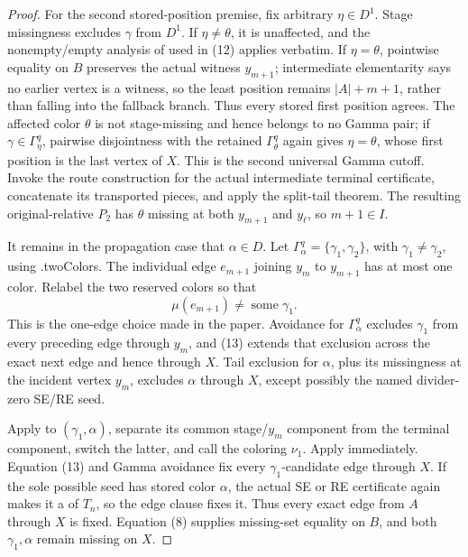 \begin{proof}
For the second stored-position premise, fix arbitrary
\(\eta\in D^1\).  Stage missingness excludes \(\gamma\) from \(D^1\).  If
\(\eta\ne\theta\), it is unaffected, and the nonempty/empty analysis of
 used in (12) applies verbatim.  If
\(\eta=\theta\), pointwise equality on \(B\) preserves the actual witness
\(y_{m+1}\); intermediate elementarity says no earlier vertex is a witness,
so the least position remains \(|A|+m+1\), rather than falling into the
fallback branch.  Thus every stored first position agrees.  The affected
color \(\theta\) is not stage-missing and hence belongs to no Gamma pair;
if \(\gamma\in\Gamma^q_\eta\), pairwise disjointness with the retained
\(\Gamma^q_\theta\) again gives \(\eta=\theta\), whose first position is
the last vertex of \(X\).  This is the second universal Gamma cutoff.
Invoke the route construction for the actual intermediate terminal
certificate, concatenate its transported pieces, and apply the split-tail
theorem.  The resulting original-relative \(P_2\) has \(\theta\) missing
at both \(y_{m+1}\) and \(y_\ell\), so \(m+1\in I\).

It remains in the propagation case that \(\alpha\in D\).  Let
\(\Gamma^q_\alpha=\{\gamma_1,\gamma_2\}\), with
\(\gamma_1\ne\gamma_2\), using .twoColors.  The
individual edge \(e_{m+1}\) joining \(y_m\) to \(y_{m+1}\) has at most one
color.  Relabel the two reserved colors so that
\[
                       \mu(e_{m+1})\ne\operatorname{some}\gamma_1. \tag{13}
\]
This is the one-edge choice made in the paper.  Avoidance for
\(\Gamma^q_\alpha\) excludes \(\gamma_1\) from every preceding edge through
\(y_m\), and (13) extends that exclusion across the exact next edge and
hence through \(X\).  Tail exclusion for \(\alpha\), plus its missingness
at the incident vertex \(y_m\), excludes \(\alpha\) through \(X\), except
possibly the named divider-zero SE/RE seed.

Apply  to \((\gamma_1,\alpha)\), separate its common
stage/\(y_m\) component from the terminal component, switch the latter,
and call the coloring \(\nu_1\).  Apply
 immediately.  Equation (13) and Gamma
avoidance fix every \(\gamma_1\)-candidate edge through \(X\).  If the sole
possible seed has stored color \(\alpha\), the actual SE or RE certificate
again makes it a  of \(T_n\), so the
 edge clause fixes it.  Thus every exact edge from
\(A\) through \(X\) is fixed.  Equation (8) supplies missing-set equality
on \(B\), and both \(\gamma_1,\alpha\) remain missing on \(X\).


\end{proof}
